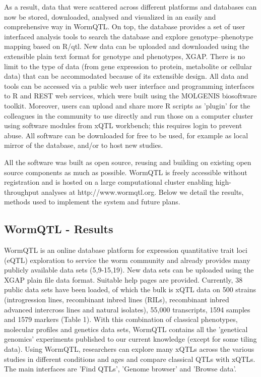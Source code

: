 \documentclass[8pt, twoside, a5paper]{report}
\begin{document}
As a result, data that were scattered across different platforms and databases can now be stored, downloaded, analysed and 
visualized in an easily and comprehensive way in WormQTL. On top, the database provides a set of user interfaced analysis 
tools to search the database and explore genotype–phenotype mapping based on R/qtl\cite{Broman:2003, Arends:2010}. New data can be uploaded and 
downloaded using the extensible plain text format for genotype and phenotypes, XGAP\cite{Swertz:2010a}. There is no limit to the type of 
data (from gene expression to protein, metabolite or cellular data) that can be accommodated because of its extensible design. 
All data and tools can be accessed via a public web user interface and programming interfaces to R and REST web services, 
which were built using the MOLGENIS biosoftware toolkit\cite{Swertz:2010b}. Moreover, users can upload and share more R scripts as 'plugin' 
for the colleagues in the community to use directly and run those on a computer cluster using software modules from xQTL 
workbench\cite{Arends:2012}; this requires login to prevent abuse. All software can be downloaded for free to be used, for example as 
local mirror of the database, and/or to host new studies.

All the software was built as open source, reusing and building on existing open source components as much as possible. WormQTL 
is freely accessible without registration and is hosted on a large computational cluster enabling high-throughput analyses at 
http://www.wormqtl.org. Below we detail the results, methods used to implement the system and future plans.

\subsection{WormQTL - Results}
WormQTL is an online database platform for expression quantitative trait loci (eQTL) exploration to service the worm community and 
already provides many publicly available data sets (5,9-15,19). New data sets can be uploaded using the XGAP plain file data format. 
Suitable help pages are provided. Currently, 38 public data sets have been loaded, of which the bulk is xQTL data on 500 strains 
(introgression lines, recombinant inbred lines (RILs), recombinant inbred advanced intercross lines and natural isolates), 55,000 
transcripts, 1594 samples and 1579 markers (Table 1). With this combination of classical phenotypes, molecular profiles and genetics 
data sets, WormQTL contains all the 'genetical genomics' experiments published to our current knowledge (except for some tiling data). 
Using WormQTL, researchers can explore many xQTLs across the various studies in different conditions and ages and compare classical 
QTLs with xQTLs. The main interfaces are 'Find QTLs', 'Genome browser' and 'Browse data'.
\end{document}

